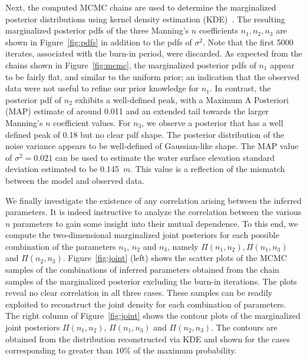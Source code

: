 Next, the computed MCMC chains are used to determine the marginalized posterior 
distributions using kernel density estimation (KDE)~\citep{Parzen1962,Silverman1986}.  
The resulting marginalized posterior pdfs of the three Manning's $n$ coefficients 
$n_1,n_2,n_3$ are shown in Figure~\ref{fig:pdfs} in addition to the pdfs of $\sigma^2$. 
Note that the first 5000 iterates, associated with the burn-in period, were discarded.  
As expected from the chains shown in Figure~\ref{fig:mcmc}, the marginalized posterior 
pdfs of $n_1$ appear to be fairly flat, and similar to the uniform prior; an indication 
that the observed data were not useful to refine our prior knowledge for $n_1$. In 
contrast, the posterior pdf of $n_2$ exhibits a well-defined peak, with a Maximum A 
Posteriori (MAP) estimate of around 0.011 and an extended tail towards the larger 
Manning's $n$ coefficient values. For $n_3$, we observe a posterior that has a well 
defined peak of 0.18 but no clear pdf shape. The posterior distribution of the noise variance 
appears to be well-defined of Gaussian-like shape. The MAP value of $\sigma^2=0.021$ 
can be used to estimate the water surface elevation standard deviation estimated to 
be 0.145~$m$. This value is a reflection of the mismatch between the model and 
observed data.

We finally investigate the existence of any correlation arising between the inferred parameters.
It is indeed instructive to analyze the 
correlation between the various $n$ parameters to gain some insight into their mutual dependence.
To this end, we compute the two-dimensional marginalized joint posteriors for each 
possible combination of the parameters $n_1$, $n_2$ and $n_3$, namely $\Pi(n_1, n_2), \Pi(n_1, n_3)$ and $\Pi(n_2, n_3)$. Figure~\ref{fig:joint} (left) shows the scatter plots of the MCMC samples of the combinations of 
inferred parameters obtained from the chain samples of the marginalized posterior excluding 
the burn-in iterations. The plots reveal no clear correlation in all three cases. 
These samples can be readily exploited to reconstruct the joint density for each combination of parameters. 
The right column of Figure~\ref{fig:joint} shows the contour plots of the marginalized joint posteriors 
$\Pi(n_1, n_2)$, $\Pi(n_1, n_3)$ and $\Pi(n_2, n_3)$. The contours are obtained from the
distribution reconstructed via KDE and shown for the cases corresponding to greater than $10\%$
of the maximum probability.


